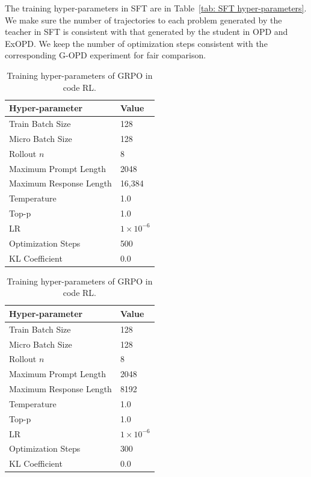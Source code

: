 \documentclass{article} %
\begin{document}
The training hyper-parameters in SFT are in Table~\ref{tab: SFT hyper-parameters}. We make sure the number of trajectories to each problem generated by the teacher in SFT is consistent with that generated by the student in OPD and ExOPD. We keep the number of optimization steps consistent with the corresponding G-OPD experiment for fair comparison.

\begin{table}[t]  
\begin{center}
\begin{minipage}[t]{0.48\linewidth}
\caption{Training hyper-parameters of GRPO in math RL.}
\label{tab: math RL hyper-parameters}
\centering
\begin{tabular}{ll}
\toprule
Hyper-parameter & Value \\
\midrule
Train Batch Size & 128  \\
Micro Batch Size & 128 \\
Rollout $n$ & 8 \\
Maximum Prompt Length & 2048 \\
Maximum Response Length & 16,384 \\
Temperature & 1.0 \\
Top-p & 1.0 \\
LR & $1\times 10^{-6}$ \\
Optimization Steps & 500 \\
KL Coefficient & 0.0 \\
\bottomrule
\end{tabular}
\end{minipage}  
\hfil
\begin{minipage}[t]{0.48\linewidth}
\caption{Training hyper-parameters of GRPO in code RL.}
\label{tab: code RL hyper-parameters}
\centering
\begin{tabular}{ll}
\toprule
Hyper-parameter & Value \\
\midrule
Train Batch Size & 128  \\
Micro Batch Size & 128 \\
Rollout $n$ & 8 \\
Maximum Prompt Length & 2048 \\
Maximum Response Length & 8192 \\
Temperature & 1.0 \\
Top-p & 1.0 \\
LR & $1\times 10^{-6}$ \\
Optimization Steps & 300 \\
KL Coefficient & 0.0 \\
\bottomrule
\end{tabular}
\end{minipage} 
\end{center}
\end{table}
\end{document}
